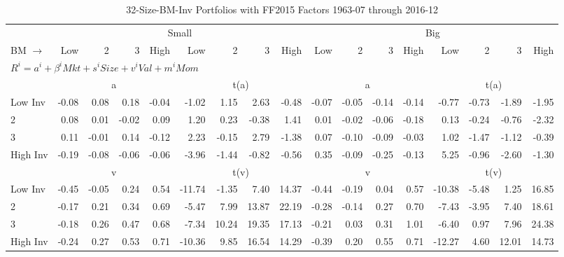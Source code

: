 
\begin{table}[!ht]
\centering
\caption{32-Size-BM-Inv Portfolios with FF2015 Factors 1963-07 through 2016-12}
\begin{tabular}{lrrrrrrrrrrrrrrrr}
  \toprule
    & \multicolumn{8}{c}{Small} & \multicolumn{8}{c}{Big} \\
      \cmidrule(r){2-9} \cmidrule(r){10-17}
    BM $\rightarrow$ & Low & 2 & 3 & High & Low & 2 & 3 & High & Low & 2 & 3 & High & Low & 2 & 3 & High \\ 
  \midrule
  \multicolumn{17}{l}{$R^i=a^i+\beta^iMkt+s^iSize+v^iVal+m^iMom$} \\

  
    
      & \multicolumn{4}{c}{a} & \multicolumn{4}{c}{t(a)}
    
      & \multicolumn{4}{c}{a} & \multicolumn{4}{c}{t(a)}
    
    \\
      \cmidrule(r){2-5} \cmidrule(r){6-9} \cmidrule(r){10-13} \cmidrule(r){14-17}

    Low Inv   & -0.08  & 0.08  & 0.18  & -0.04  & -1.02  & 1.15  & 2.63  & -0.48  & -0.07  & -0.05  & -0.14  & -0.14  & -0.77  & -0.73  & -1.89  & -1.95  \\
           2  & 0.08  & 0.01  & -0.02  & 0.09  & 1.20  & 0.23  & -0.38  & 1.41  & 0.01  & -0.02  & -0.06  & -0.18  & 0.13  & -0.24  & -0.76  & -2.32  \\
           3  & 0.11  & -0.01  & 0.14  & -0.12  & 2.23  & -0.15  & 2.79  & -1.38  & 0.07  & -0.10  & -0.09  & -0.03  & 1.02  & -1.47  & -1.12  & -0.39  \\
    High Inv  & -0.19  & -0.08  & -0.06  & -0.06  & -3.96  & -1.44  & -0.82  & -0.56  & 0.35  & -0.09  & -0.25  & -0.13  & 5.25  & -0.96  & -2.60  & -1.30  \\

  
    
      & \multicolumn{4}{c}{v} & \multicolumn{4}{c}{t(v)}
    
      & \multicolumn{4}{c}{v} & \multicolumn{4}{c}{t(v)}
    
    \\
      \cmidrule(r){2-5} \cmidrule(r){6-9} \cmidrule(r){10-13} \cmidrule(r){14-17}

    Low Inv   & -0.45  & -0.05  & 0.24  & 0.54  & -11.74  & -1.35  & 7.40  & 14.37  & -0.44  & -0.19  & 0.04  & 0.57  & -10.38  & -5.48  & 1.25  & 16.85  \\
           2  & -0.17  & 0.21  & 0.34  & 0.69  & -5.47  & 7.99  & 13.87  & 22.19  & -0.28  & -0.14  & 0.27  & 0.70  & -7.43  & -3.95  & 7.40  & 18.61  \\
           3  & -0.18  & 0.26  & 0.47  & 0.68  & -7.34  & 10.24  & 19.35  & 17.13  & -0.21  & 0.03  & 0.31  & 1.01  & -6.40  & 0.97  & 7.96  & 24.38  \\
    High Inv  & -0.24  & 0.27  & 0.53  & 0.71  & -10.36  & 9.85  & 16.54  & 14.29  & -0.39  & 0.20  & 0.55  & 0.71  & -12.27  & 4.60  & 12.01  & 14.73  \\


\end{tabular}
\end{table}
